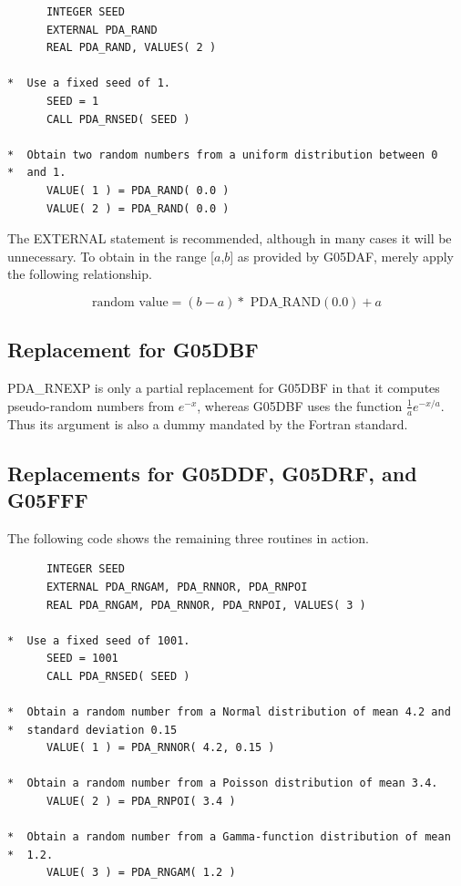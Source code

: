 \documentclass[11pt,twoside]{article}
\newcommand{\xlabel}[1]{}
\begin{document}
\begin{verbatim}
      INTEGER SEED
      EXTERNAL PDA_RAND
      REAL PDA_RAND, VALUES( 2 )

*  Use a fixed seed of 1.
      SEED = 1
      CALL PDA_RNSED( SEED )

*  Obtain two random numbers from a uniform distribution between 0
*  and 1.
      VALUE( 1 ) = PDA_RAND( 0.0 )
      VALUE( 2 ) = PDA_RAND( 0.0 )
\end{verbatim}

   The EXTERNAL statement is recommended, although in many cases it
   will be unnecessary.  To obtain  in the range [$a$,$b$] as
   provided by G05DAF, merely apply the following relationship.

   \[  \mbox{random value} = (b - a) * \mbox{ PDA\_RAND}( 0.0 ) + a \]

\subsection{\xlabel{replacement_for_g05dbf}Replacement for G05DBF}

   PDA\_RNEXP is only a partial replacement for G05DBF in that it
   computes pseudo-random numbers from $e^{-x}$, whereas G05DBF
   uses the function $\frac{1}{a}e^{-x/a}$.  Thus its argument is
   also a dummy mandated by the Fortran standard.

\subsection{\xlabel{replacements_for_g05ddf,_g05drf,_and_g05fff}Replacements for G05DDF, G05DRF, and G05FFF}

The following code shows the remaining three routines in action.

\begin{verbatim}
      INTEGER SEED
      EXTERNAL PDA_RNGAM, PDA_RNNOR, PDA_RNPOI
      REAL PDA_RNGAM, PDA_RNNOR, PDA_RNPOI, VALUES( 3 )

*  Use a fixed seed of 1001.
      SEED = 1001
      CALL PDA_RNSED( SEED )

*  Obtain a random number from a Normal distribution of mean 4.2 and
*  standard deviation 0.15
      VALUE( 1 ) = PDA_RNNOR( 4.2, 0.15 )

*  Obtain a random number from a Poisson distribution of mean 3.4.
      VALUE( 2 ) = PDA_RNPOI( 3.4 )

*  Obtain a random number from a Gamma-function distribution of mean
*  1.2.
      VALUE( 3 ) = PDA_RNGAM( 1.2 )
\end{verbatim}
\end{document}
